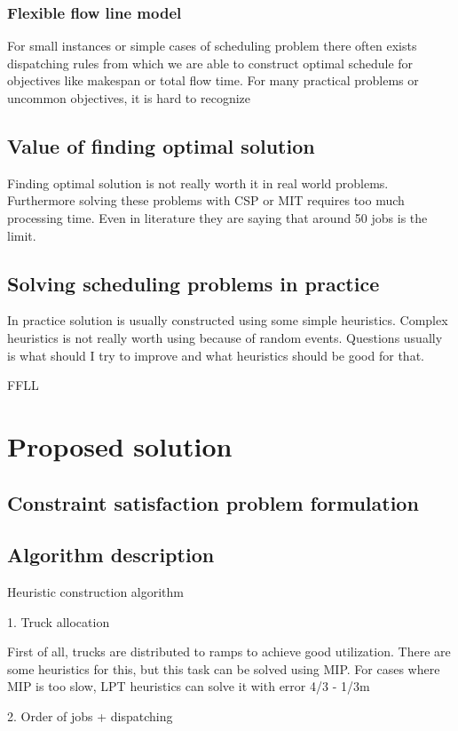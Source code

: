\documentclass{ctuthesis}
\begin{document}
\subsection{Flexible flow line model}

For small instances or simple cases of scheduling problem there often exists dispatching rules from which we are able to construct optimal schedule for objectives like makespan or total flow time. For many practical problems or uncommon objectives, it is hard to recognize 

\section{Value of finding optimal solution}
Finding optimal solution is not really worth it in real world problems. Furthermore solving these problems with CSP or MIT requires too much processing time. Even in literature they are saying that around 50 jobs is the limit. 
\section{Solving scheduling problems in practice}
In practice solution is usually constructed using some simple heuristics. Complex heuristics is not really worth using because of random events. Questions usually is what should I try to improve and what heuristics should be good for that. 

FFLL 
\chapter{Proposed solution}
\label{ch:Proposed solution}
\section{Constraint satisfaction problem formulation}
\section{Algorithm description}
Heuristic construction algorithm

1. Truck allocation

First of all, trucks are distributed to ramps to achieve good utilization. There are some heuristics for this, but this task can be solved using MIP. For cases where MIP is too slow, LPT heuristics can solve it with error 4/3 - 1/3m 
\cite{gram1969}


2. Order of jobs + dispatching
\end{document}
